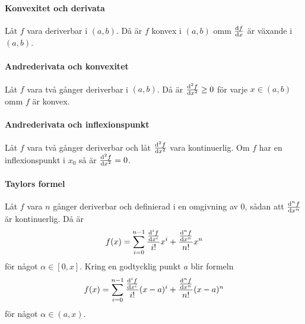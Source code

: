 \proof

\paragraph{Konvexitet och derivata}
Låt $f$ vara deriverbar i $(a, b)$. Då är $f$ konvex i $(a, b)$ omm $\dv{f}{x}$ är växande i $(a, b)$.

\proof

\paragraph{Andrederivata och konvexitet}
Låt $f$ vara två gånger deriverbar i $(a, b)$. Då är $\dv[2]{f}{x} (x)\geq 0$ för varje $x\in (a, b)$ omm $f$ är konvex.

\proof

\paragraph{Andrederivata och inflexionspunkt}
Låt $f$ vara två gånger deriverbar och låt $\dv[2]{f}{x}$ vara kontinuerlig. Om $f$ har en inflexionspunkt i $x_0$ så är $\dv[2]{f}{x} (x_0) = 0$.

\proof

\paragraph{Taylors formel}
Låt $f$ vara $n$ gånger deriverbar och definierad i en omgivning av $0$, sådan att $\dv[n]{f}{x}$ är kontinuerlig. Då är
\begin{align*}
	f(x) = \sum\limits_{i = 0}^{n - 1}\frac{\dv[i]{f}{x} (0)}{i!}x^i + \frac{\dv[n]{f}{x} (\alpha)}{n!}x^n
\end{align*}
för något $\alpha\in [0, x]$. Kring en godtycklig punkt $a$ blir formeln
\begin{align*}
	f(x) = \sum\limits_{i = 0}^{n - 1}\frac{\dv[i]{f}{x} (a)}{i!}(x - a)^i + \frac{\dv[n]{f}{x} (\alpha)}{n!}(x - a)^n
\end{align*}
för något $\alpha\in (a, x)$.

\proof